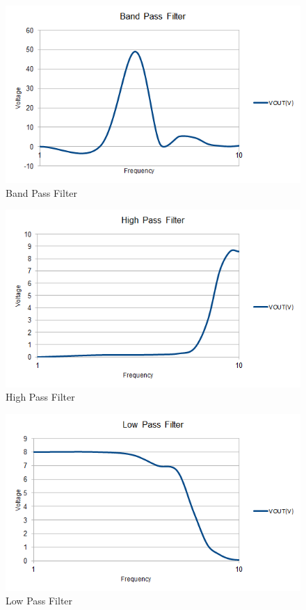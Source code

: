 \documentclass{article}
\begin{document}
\begin{figure}[!ht]
\caption{Band Pass Filter}
\begin{center}

\includegraphics{BandPass.png}
\end{center}
\end{figure}


\begin{figure}[!ht]
\caption{High Pass Filter}
\begin{center}

\includegraphics{HighPass.png}
\end{center}
\end{figure}


\begin{figure}[!ht]
\caption{Low Pass Filter}
\begin{center}

\includegraphics{LowPass.png}
\end{center}
\end{figure}
\end{document}

